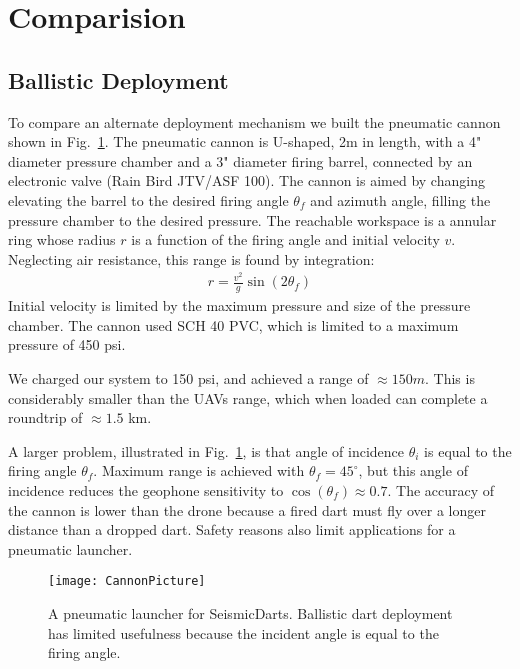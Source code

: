 \section{Comparision}\label{sec:Comparision}

\subsection{Ballistic Deployment}
To compare an alternate deployment mechanism we built the pneumatic cannon shown in Fig.~\ref{fig:CannonPicture}.
The pneumatic cannon is U-shaped,  2m in length, with a 4" diameter pressure chamber and a 3" diameter firing barrel, connected by an electronic valve (Rain Bird JTV/ASF 100). 
The cannon is aimed by changing elevating the barrel to the desired firing angle $\theta_f$  and azimuth angle, filling the pressure chamber to the desired pressure.  
The reachable workspace is a annular ring whose radius $r$ is a function of the firing angle and initial velocity $v$. 
Neglecting air resistance, this range is found by integration:
\begin{align}
r = \frac{v^2}{g} \sin( 2 \theta_f )
\end{align} 
Initial velocity is limited by the maximum pressure and size of the pressure chamber.
The cannon used  SCH 40 PVC, which is limited to a maximum pressure of 450 psi.

We charged our system to 150 psi, and achieved a range of $\approx 150 m$.
This is considerably smaller than the UAVs range, which when loaded can complete a roundtrip of $\approx 1.5$ km.

A larger problem, illustrated in Fig.~\ref{fig:CannonPicture}, is that angle of incidence $\theta_i$ is equal to the firing angle $\theta_f$. 
Maximum range is achieved with $\theta_f = 45^\circ$, but this angle of incidence reduces the geophone sensitivity to $\cos(\theta_f )\approx 0.7$.
The accuracy of the cannon is lower than the drone because a fired dart must fly over a longer distance than a dropped dart. 
Safety reasons also limit applications for a pneumatic launcher.


\begin{figure} \centering
  {\texttt{[image: CannonPicture]}}
 \caption{A pneumatic launcher for SeismicDarts.  Ballistic dart deployment has limited usefulness because the incident angle is equal to the firing angle.} 
 \label{fig:CannonPicture}
\end{figure}



